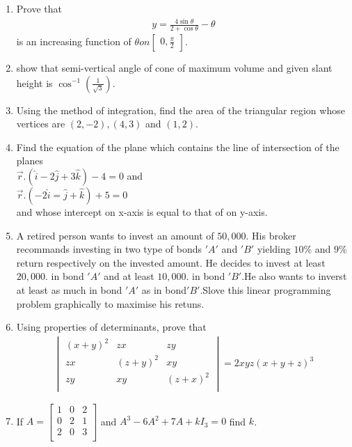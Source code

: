 \documentclass[12pt,-letter paper]{article}
\providecommand{\mydet}[1]{\ensuremath{\begin{vmatrix}#1\end{vmatrix}}}
\providecommand{\myvec}[1]{\ensuremath{\begin{bmatrix}#1\end{bmatrix}}}
\providecommand{\brak}[1]{\ensuremath{\left(#1\right)}}
\begin{document}
\begin{enumerate}
		  \item Prove that \begin{align*}
		  y=\frac{4\sin{\theta}}{2+\cos{\theta}}-\theta
		  \end{align*}
		  is an increasing function of $\theta on  \myvec{0,\frac{\pi}{2}}$.

			  \item  show that semi-vertical angle of cone of maximum volume and given slant height is  $\cos^{-1}\brak{\frac{1}{\sqrt{3}}}$.

			  \item Using the method of integration, find the area of the triangular region whose vertices are $\brak{2,-2}, \brak{4,3}$ and $\brak{1,2}$.

			  \item Find the equation of the plane which contains the line  of intersection of the planes\\                       $\overset{\rightarrow}{r}.\brak{\hat{i}-2\hat{j}+3\hat{k}}-4=0$ and \\ $\overset{\rightarrow}{r}.\brak{-2\hat{i}=\hat{j}+\hat{k}}+5=0$\\ and whose intercept on x-axis is equal to that of on y-axis.

			  \item A retired person wants to invest an amount of \rupee$50,000$. His broker recommands investing in two type of bonds $'A'$ and $'B'$ yielding $10\%$ and $9\%$ return respectively on the invested amount. He decides to invest at least\rupee$20,000$. in bond $'A'$ and at least \rupee$10,000$. in bond $'B'$.He also wants to inverst at least as much in bond $'A'$ as in bond$'B'$.Slove this linear programming problem graphically to maximise his retuns.


			  \item Using properties of determinants, prove that \begin{align*}
			  \mydet{ \brak{x+y}^{2} & zx &  zy\\ zx & \brak{z+y}^{2} & xy    \\ zy & xy & \brak{z+x}^{2}\\}=2    xyz\brak{x+y+z}^{3} 
			  \end{align*}
    
           \item  If $A=\myvec{1 & 0 & 2 \\                                            0  & 2 & 1 \\                                         2 & 0 & 3 \\}$ and $A^3-6A^2+7A+kI_3=0$  find $k$.

 \end{enumerate}
    
\end{document}
